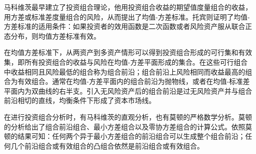 

\begin{tcolorbox}[summary,title=本章小结]
马科维茨最早建立了投资组合理论，他用投资组合收益的期望值度量组合的收益，用方差或标准差度量组合的风险，从而提出了均值-方差标准。托宾则证明了均值-方差标准的适用条件：如果投资者的效用函数是二次函数或者风险资产服从联合正态分布，则均值方差标准有效。

在均值方差标准下，从两资产到多资产情形可以得到投资组合形成的可行集和有效集，即所有投资组合的收益与风险在均值-方差平面形成的集合。在这些可行组合中收益相同且风险最低的组合称为组合前沿；组合前沿上风险相同而收益最高的组合为有效组合。通常在均值-方差平面内的组合前沿为抛物线，或者在均值-标准差平面内为双曲线的右半支。引入无风险资产后的组合前沿是过无风险资产并与组合前沿相切的直线，均衡条件下形成了资本市场线。

在进行投资组合分析时，有马科维茨的直观分析，也有莫顿的严格数学分析。莫顿的分析给出了组合前沿组合、最小方差组合以及零协方差组合的计算公式。依照莫顿的结果可知：任何两个异于最小方差组合的前沿组合可以生成整个组合前沿；任何几个前沿组合或有效组合的凸组合依然是前沿组合或有效组合。
\end{tcolorbox}



